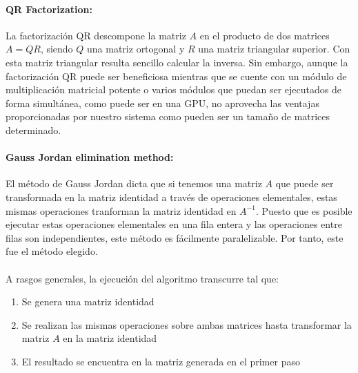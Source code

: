 \paragraph{QR Factorization\citep{alberto_oliveira_de_souza_junior_exploration_2020}:}
La factorización QR descompone la matriz $A$ en el producto de dos matrices $A = QR$, siendo $Q$ una matriz ortogonal y $R$ una matriz triangular superior. Con esta matriz triangular resulta sencillo calcular la inversa. Sin embargo, aunque la factorización QR puede ser beneficiosa mientras que se cuente con un módulo de multiplicación matricial potente o varios módulos que puedan ser ejecutados de forma simultánea, como puede ser en una GPU, no aprovecha las ventajas proporcionadas por nuestro sistema como pueden ser un tamaño de matrices determinado.
\paragraph{Gauss Jordan elimination method\cite{gonzalez_fpga_2016}:}
El método de Gauss Jordan dicta que si tenemos una matriz $A$ que puede ser transformada en la matriz identidad a través de operaciones elementales, estas mismas operaciones tranforman la matriz identidad en $A^{-1}$. Puesto que es posible ejecutar estas operaciones elementales en una fila entera y las operaciones entre filas son independientes, este método es fácilmente paralelizable.
Por tanto, este fue el método elegido.
\\
\\
A rasgos generales, la ejecución del algoritmo transcurre tal que:
\begin{enumerate}
\item Se genera una matriz identidad
\item Se realizan las mismas operaciones sobre ambas matrices hasta transformar la matriz $A$ en la matriz identidad
\item El resultado se encuentra en la matriz generada en el primer paso
\end{enumerate}

